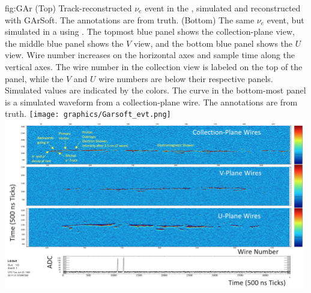 \begin{dunefigure}{fig:GAr}
{(Top) Track-reconstructed $\nu_e$  event in the , simulated and reconstructed with GArSoft.  The annotations are from  truth. (Bottom) The same $\nu_e$  event, but simulated in a  using .  The topmost blue panel shows the collection-plane view, the middle blue panel shows the $V$ view, and the bottom blue panel shows the $U$ view.  Wire number increases on the horizontal axes and sample time along the vertical axes.   The wire number in the collection view is labeled on the top of the panel, while the $V$ and $U$ wire numbers are below their respective panels. Simulated  values are indicated by the colors.  The curve in the bottom-most panel is a simulated waveform from a collection-plane wire.  The annotations are from  truth.}
    \texttt{[image: graphics/Garsoft\_evt.png]}
    \includegraphics[width=0.99\textwidth]{graphics/nuenppinliquid.png}
\end{dunefigure}
%
%
%

